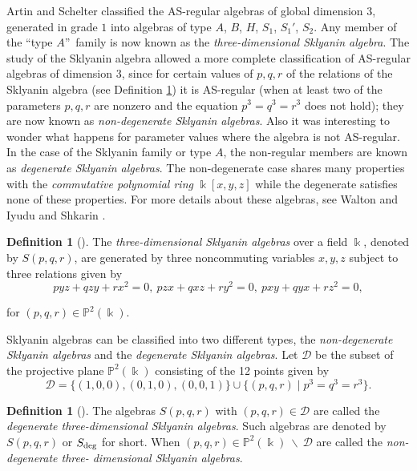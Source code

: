 \documentclass{amsart}
\theoremstyle{definition}
\newtheorem{definition}[theorem]{Definition}
\theoremstyle{remark}
\numberwithin{equation}{section}
\begin{document}
Artin and Schelter classified the AS-regular algebras of global dimension $3$, generated in grade $1$ into algebras of type $A$, $B$, $H$, $S_1$, $S_1'$, $S_2$. Any member of the \textquotedblleft type $A$\textquotedblright \ family is now known as the { \em three-dimensional Sklyanin algebra}. The study of the Sklyanin algebra allowed a more complete classification of AS-regular algebras of dimension $3$, since for certain values of $p,q,r$ of the relations of the Sklyanin algebra (see Definition \ref{Def.3-dim SA}) it is AS-regular (when at least two of the parameters $p,q, r$ are nonzero and the equation $p^3 = q^3 = r^3$ does not hold); they are now known as {\em non-degenerate Sklyanin algebras}. Also it was interesting to wonder what happens for parameter values where the algebra is not AS-regular. In the case of the Sklyanin family or type $A$, the non-regular members are known as {\em degenerate Sklyanin algebras}. The non-degenerate case shares many properties with the {\em commutative polynomial ring} $\Bbbk[x,y,z]$ while the degenerate satisfies none of these properties. For more details about these algebras, see Walton \cite{Walton2009} and Iyudu and Shkarin \cite{ IyuduShkarin2017}.

\begin{definition}[{\cite[p. 382]{IyuduShkarin2017}}]\label{Def.3-dim SA}
The {\em three-dimensional Sklyanin algebras} over a field $\Bbbk$, denoted by $S(p, q, r)$, are generated by three noncommuting variables $x, y, z$ subject to three relations given by
\begin{equation}\label{rel3Skly}
    pyz + qzy + rx^2 =0, \ pzx + qxz + ry^2 =0, \ pxy + qyx + rz^2 =0, 
\end{equation}
    
for $(p,q,r)\in \mathbb{P}^2(\Bbbk)$.
\end{definition}

Sklyanin algebras can be classified into two different types, the \textit{non-degenerate Sklyanin algebras} and the \textit{degenerate Sklyanin algebras}. Let $\mathcal{D}$ be the subset of the projective plane $\mathbb{P}^2(\Bbbk)$ consisting of the 12 points given by
\[
\mathcal{D}=\{(1,0,0), (0,1,0),(0,0,1)\} \cup \{(p,q,r) \mid p^3=q^3=r^3 \}.
\]

\begin{definition}[{\cite[Definition 1.4]{Walton2009}}] \label{Def.Deg.nonDeg}  
The algebras $S(p,q,r)$ with $(p,q,r)\in \mathcal{D}$ are called the {\em degenerate three-dimensional Sklyanin algebras}. Such algebras are denoted by $S(p,q,r)$ or $S_{{\rm deg}}$ for short. When $(p,q,r)\in \mathbb{P}^2(\Bbbk)\ \backslash\  \mathcal{D}$ are called the {\em non-degenerate three- dimensional Sklyanin algebras}.
\end{definition}
\end{document}
